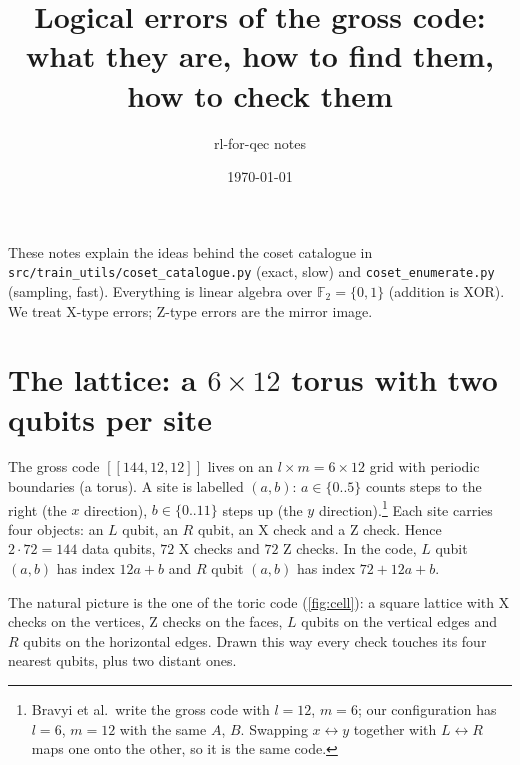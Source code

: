 \documentclass[11pt]{article}
\title{Logical errors of the gross code:\\ what they are, how to find them, how to check them}
\author{rl-for-qec notes}
\date{\today}
\newcommand{\F}{\mathbb{F}_2}
\begin{document}
\maketitle

\noindent These notes explain the ideas behind the coset catalogue in
\texttt{src/train\_utils/coset\_catalogue.py} (exact, slow) and
\texttt{coset\_enumerate.py} (sampling, fast). Everything is linear algebra over
$\F=\{0,1\}$ (addition is XOR). We treat X-type errors; Z-type errors are the mirror image.

\tableofcontents

\section{The lattice: a $6\times 12$ torus with two qubits per site}

The gross code $[[144,12,12]]$ lives on an $l\times m = 6\times 12$ grid with periodic
boundaries (a torus). A site is labelled $(a,b)$: $a\in\{0..5\}$ counts steps to the right
(the $x$ direction), $b\in\{0..11\}$ steps up (the $y$ direction).\footnote{Bravyi et al.\ write
the gross code with $l=12$, $m=6$; our configuration has $l=6$, $m=12$ with the same $A$, $B$.
Swapping $x\leftrightarrow y$ together with $L\leftrightarrow R$ maps one onto the other, so it is
the same code.} Each site carries four objects: an \textcolor{Lc}{$L$ qubit}, an
\textcolor{Rc}{$R$ qubit}, an \textcolor{Xc}{X check} and a \textcolor{Zc}{Z check}. Hence
$2\cdot 72 = 144$ data qubits, $72$ X checks and $72$ Z checks. In the code, $L$ qubit $(a,b)$
has index $12a+b$ and $R$ qubit $(a,b)$ has index $72+12a+b$.

The natural picture is the one of the toric code (\cref{fig:cell}): a square lattice with
X checks on the vertices, Z checks on the faces, $L$ qubits on the vertical edges and $R$
qubits on the horizontal edges. Drawn this way every check touches its four nearest qubits,
plus two distant ones.
\end{document}
